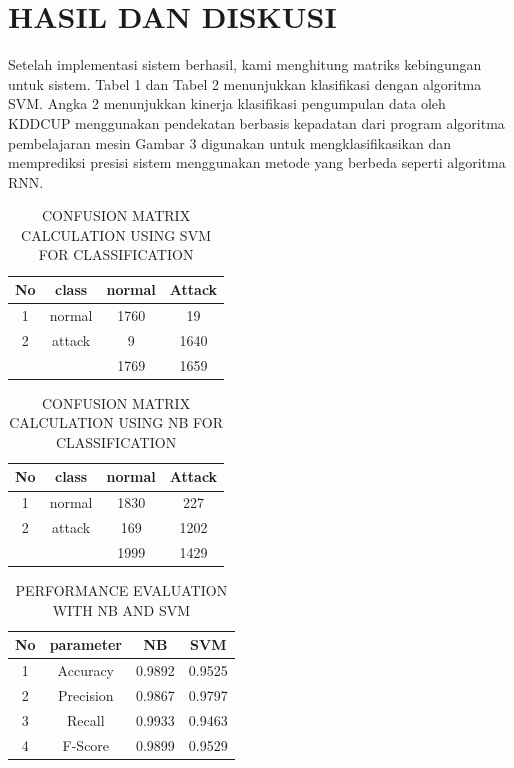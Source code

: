 \documentclass[conference]{IEEEtran}
\begin{document}
\section{HASIL DAN DISKUSI}

Setelah implementasi sistem berhasil, kami menghitung matriks kebingungan untuk sistem. Tabel 1 dan Tabel 2 menunjukkan klasifikasi dengan algoritma SVM. Angka
2 menunjukkan kinerja klasifikasi pengumpulan data oleh KDDCUP menggunakan pendekatan berbasis kepadatan dari program algoritma pembelajaran mesin Gambar 3 digunakan untuk mengklasifikasikan dan memprediksi presisi sistem menggunakan
metode yang berbeda seperti algoritma RNN.

\begin{table}[hptb]
    \centering
    \caption{CONFUSION MATRIX CALCULATION USING SVM FOR CLASSIFICATION}
\begin{tabular}{|c|c|c|c|}
\hline
No & class & normal & Attack\\
\hline
1   & normal & 1760 & 19\\
\hline
2   & attack & 9 & 1640\\
\hline
\multicolumn{1}{c}{}  &  & 1769 & 1659 \\
\cline{3-4}
\end{tabular}
\end{table}


\begin{table}[hptb]
    \centering
    \caption{CONFUSION MATRIX CALCULATION USING NB FOR CLASSIFICATION}
    \begin{tabular}{|c|c|c|c|}
    \hline
    No & class & normal & Attack\\
    \hline
    1   & normal & 1830 & 227\\
    \hline
    2   & attack & 169 & 1202\\
    \hline
    \multicolumn{1}{c}{} &  & 1999 & 1429 \\
    \cline{3-4}
    \end{tabular}
\end{table}

\begin{table}[hptb]
    \centering
    \caption{PERFORMANCE EVALUATION WITH NB AND SVM}
\begin{tabular}{|c|c|c|c|}
\hline
No & parameter & NB & SVM\\
\hline
1   & Accuracy & 0.9892 & 0.9525\\
\hline
2   & Precision & 0.9867 & 0.9797\\
\hline
3   & Recall & 0.9933 & 0.9463 \\
\hline
4   & F-Score& 0.9899 & 0.9529 \\
\hline
\end{tabular}
\end{table}
\end{document}
